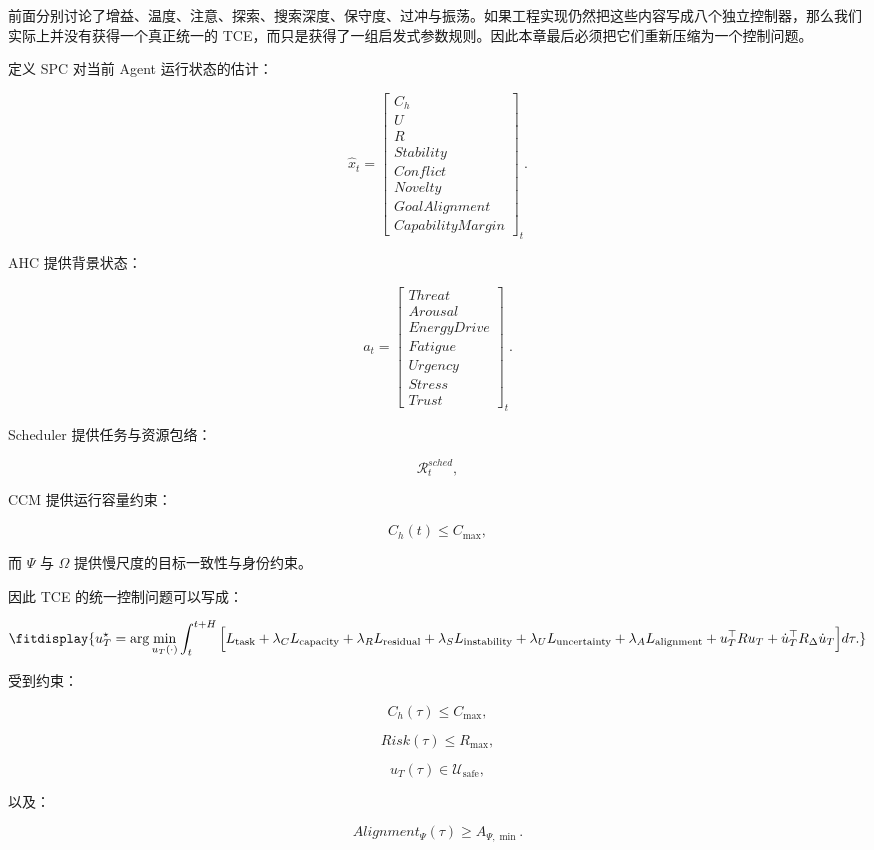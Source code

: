 前面分别讨论了增益、温度、注意、探索、搜索深度、保守度、过冲与振荡。如果工程实现仍然把这些内容写成八个独立控制器，那么我们实际上并没有获得一个真正统一的 TCE，而只是获得了一组启发式参数规则。因此本章最后必须把它们重新压缩为一个控制问题。

定义 SPC 对当前 Agent 运行状态的估计：

\[
\hat x_t
=
\begin{bmatrix}
C_h\\
U\\
R\\
Stability\\
Conflict\\
Novelty\\
GoalAlignment\\
CapabilityMargin
\end{bmatrix}_t.
\]

AHC 提供背景状态：

\[
a_t
=
\begin{bmatrix}
Threat\\
Arousal\\
EnergyDrive\\
Fatigue\\
Urgency\\
Stress\\
Trust
\end{bmatrix}_t.
\]

Scheduler 提供任务与资源包络：

\[
\mathcal R_t^{sched},
\]

CCM 提供运行容量约束：

\[
C_h(t)\le C_{\max},
\]

而 $\Psi$ 与 $\Omega$ 提供慢尺度的目标一致性与身份约束。

因此 TCE 的统一控制问题可以写成：

\[
\fitdisplay{
u_T^\star
=
\arg\min_{u_T(\cdot)}
\int_t^{t+H}
\Big[
L_{\mathrm{task}}
+
\lambda_C L_{\mathrm{capacity}}
+
\lambda_R L_{\mathrm{residual}}
+
\lambda_S L_{\mathrm{instability}}
+
\lambda_U L_{\mathrm{uncertainty}}
+
\lambda_A L_{\mathrm{alignment}}
+
u_T^\top Ru_T
+
\dot u_T^\top R_\Delta\dot u_T
\Big]
d\tau .
}
\]

受到约束：

\[
C_h(\tau)\le C_{\max},
\]

\[
Risk(\tau)\le R_{\max},
\]

\[
u_T(\tau)
\in
\mathcal U_{\mathrm{safe}},
\]

以及：

\[
Alignment_\Psi(\tau)\ge A_{\Psi,\min}.
\]

